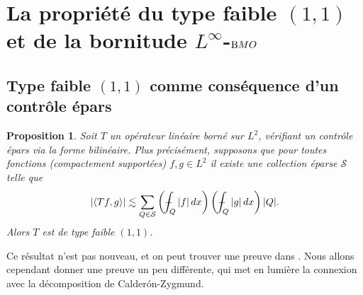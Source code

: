 \documentclass[11pt]{amsart}
\newtheorem{proposition}[theorem]{Proposition}
\newcommand{\mcS}{{\mathcal S}}
\newcommand{\BMO}{{\textrm BMO}}
\def\Xint#1{\mathchoice
   {\XXint\displaystyle\textstyle{#1}}%
   {\XXint\textstyle\scriptstyle{#1}}%
   {\XXint\scriptstyle\scriptscriptstyle{#1}}%
   {\XXint\scriptscriptstyle\scriptscriptstyle{#1}}%
   \!\int}
\def\XXint#1#2#3{{\setbox0=\hbox{$#1{#2#3}{\int}$}
     \vcenter{\hbox{$#2#3$}}\kern-.5\wd0}}
\def\aver#1{\Xint-_{#1}}
\begin{document}
\section{La propri\'et\'e du type faible $(1,1)$ et de la bornitude $L^\infty$-$\BMO$}

\subsection{Type faible $(1,1)$ comme cons\'equence d'un contr\^ole \'epars}

\begin{proposition} \label{prop:typefaible} Soit $T$ un op\'erateur lin\'eaire born\'e sur $L^2$, v\'erifiant un contr\^ole \'epars via la forme bilin\'eaire. Plus pr\'ecis\'ement, supposons que pour toutes fonctions (compactement support\'ees) $f,g\in L^2$ il existe une collection \'eparse $\mcS$ telle que
$$ \left| \langle Tf,g \rangle \right| \lesssim \sum_{Q\in \mcS} \left(\aver{Q} |f|\, dx \right) \left(\aver{Q} |g|\, dx \right) |Q|.$$
Alors $T$ est de type faible $(1,1)$.
\end{proposition}

Ce r\'esultat n'est pas nouveau, et on peut trouver une preuve dans \cite[Th\'eor\`eme E]{CCDO}. Nous allons cependant donner une preuve un peu diff\'erente, qui met en lumi\`ere la connexion avec la d\'ecomposition de Calder\'on-Zygmund.
\end{document}
